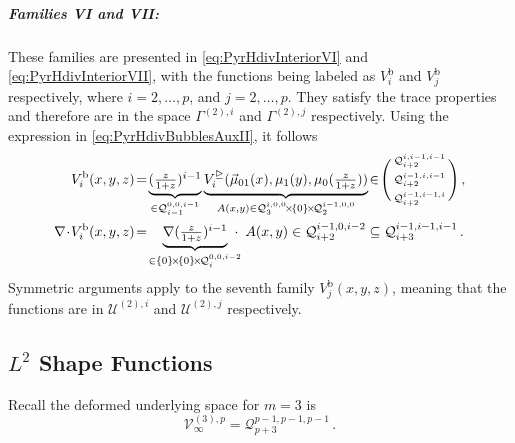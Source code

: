 \subparagraph{Families VI and VII:}
These families are presented in \eqref{eq:PyrHdivInteriorVI} and \eqref{eq:PyrHdivInteriorVII}, with the functions being labeled as $V_{i}^\mathrm{b}$ and $V_{j}^\mathrm{b}$ respectively, where $i=2,\ldots,p$, and $j=2,\ldots,p$.
They satisfy the trace properties and therefore are in the space $\Gamma^{(2),i}$ and $\Gamma^{(2),j}$ respectively.
Using the expression in \eqref{eq:PyrHdivBubblesAuxII}, it follows
\begin{equation}
\begin{aligned}
	V_{i}^\mathrm{b}(x,y,z)&\!=\!
		\underbrace{(\textstyle{\frac{z}{1+z}})^{i-1}}_{\in\mathcal{Q}_{i-1}^{0,0,i-1}}
			\underbrace{V_i^\trianglerighteq(\vec{\mu}_{01}(x),\mu_1(y),\mu_0(\szzz))}_{A(x,y)
				\in\mathcal{Q}_3^{i,0,0}\!\times\!\{0\}\!\times\!\mathcal{Q}_2^{i-1,0,0}}
						\!\in\!\Bigg(\begin{smallmatrix}\mathcal{Q}_{i+2}^{i,i-1,i-1}\\[2pt]\mathcal{Q}_{i+2}^{i-1,i,i-1}\\[2pt]
							\mathcal{Q}_{i+2}^{i-1,i-1,i}\end{smallmatrix}\Bigg)\,,\\
	\nabla\!\cdot\! V_{i}^\mathrm{b}(x,y,z)&\!=\!
		\underbrace{\nabla (\textstyle{\frac{z}{1+z}})^{i-1}}_{
			\in\{0\}\!\times\!\{0\}\!\times\!\mathcal{Q}_{i}^{0,0,i-2}}
				\!\!\!\!\cdot\,\,\, A(x,y)\in\mathcal{Q}_{i+2}^{i-1,0,i-2}
					\subseteq\mathcal{Q}_{i+3}^{i-1,i-1,i-1}\,.
\end{aligned}
\end{equation}
Symmetric arguments apply to the seventh family $V_j^\mathrm{b}(x,y,z)$, meaning that the functions are in $\mathcal{U}^{(2),i}$ and $\mathcal{U}^{(2),j}$ respectively.


\subsection{\texorpdfstring{$L^2$}{L2} Shape Functions}

Recall the deformed underlying space for $m=3$ is
\begin{equation*}
	\mathcal{V}_\infty^{(3),p}=\mathcal{Q}_{p+3}^{p-1,p-1,p-1}\,.
\end{equation*}

